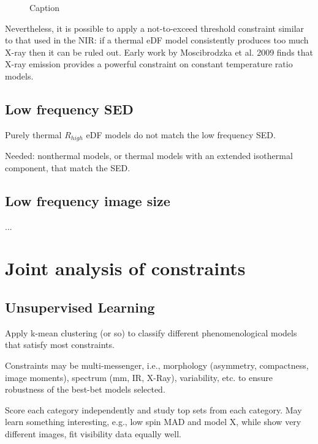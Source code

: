 \documentclass[twocolumn,tighten,dvipsnames]{aastex63}
\newcommand\<{{\langle}}
\renewcommand\>{{\rangle}} %
\begin{document}
\begin{figure}
    \centering
    \caption{Caption}
    \label{fig:SEDexamp}
\end{figure}

Nevertheless, it is possible to apply a not-to-exceed threshold constraint similar to that used in the NIR: if a thermal eDF model consistently produces too much X-ray then it can be ruled out.  Early work by Moscibrodzka et al. 2009 finds that X-ray emission provides a powerful constraint on constant temperature ratio models.

\subsection{Low frequency SED}

Purely thermal $R_{high}$ eDF models do not match the low frequency SED.

Needed: nonthermal models, or thermal models with an extended isothermal component, that match the SED.

\subsection{Low frequency image size}
...

\section{Joint analysis of constraints}
\subsection{Unsupervised Learning}

Apply k-mean clustering (or so) to classify different phenomenological models that satisfy most constraints.

Constraints may be multi-messenger, i.e., morphology (asymmetry, compactness, image moments), spectrum (mm, IR, X-Ray), variability, etc. to ensure robustness of the best-bet models selected.

Score each category independently and study top sets from each category.  May learn something interesting, e.g., low spin MAD and model X, while show very different images, fit visibility data equally well.
\end{document}

